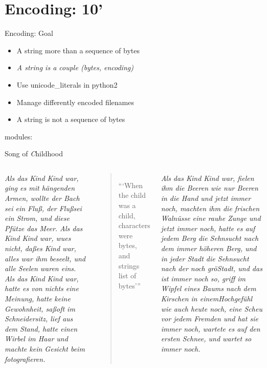 \section{Encoding: 10'}

\begin{pyframe}{Encoding: Goal}
\Large
\begin{itemize}
\item A string more than a sequence of bytes
\item \emph{A string is a couple (bytes, encoding)}
\item Use unicode\_literals in python2
\item Manage differently encoded filenames
\item A string is not a sequence of bytes
\end{itemize}
modules: 
\end{pyframe}


\begin{pyframe}{Song of \emph{C}hildhood}
\begin{columns}

\tiny
\textit{Als das Kind Kind war, ging es mit hängenden Armen,
wollte der Bach sei ein Flu\ss, der Flu\ss sei ein Strom,
und diese Pf\"utze das Meer.
\newline
Als das Kind Kind war,  wu\sste es nicht, da\ss es Kind war,
alles war ihm beseelt, und alle Seelen waren eins.
\newline
Als das Kind Kind war,
hatte es von nichts eine Meinung,
hatte keine Gewohnheit,
sa\ss oft im Schneidersitz,
lief aus dem Stand,
hatte einen Wirbel im Haar
und machte kein Gesicht beim fotografieren.
}
\begin{verse}
\begin{center}
\Large
```When the child was a child,\\
\vspace{.5cm}
characters were bytes, and\\
\vspace{.5cm}
strings list of bytes'''
\end{center}
\end{verse}

\tiny \textit{Als das Kind Kind war,
fielen ihm die Beeren wie nur Beeren in die Hand
und jetzt immer noch,
machten ihm die frischen Waln\"usse eine rauhe Zunge
und jetzt immer noch,
hatte es auf jedem Berg
die Sehnsucht nach dem immer h\"oheren Berg,
und in jeder Stadt
die Sehnsucht nach der noch gr\"o\sseren Stadt,
und das ist immer noch so,
griff im Wipfel eines Baums nach dem Kirschen in einemHochgef\"uhl
wie auch heute noch,
eine Scheu vor jedem Fremden
und hat sie immer noch,
wartete es auf den ersten Schnee,
und wartet so immer noch.
}
\end{columns}
\end{pyframe}


